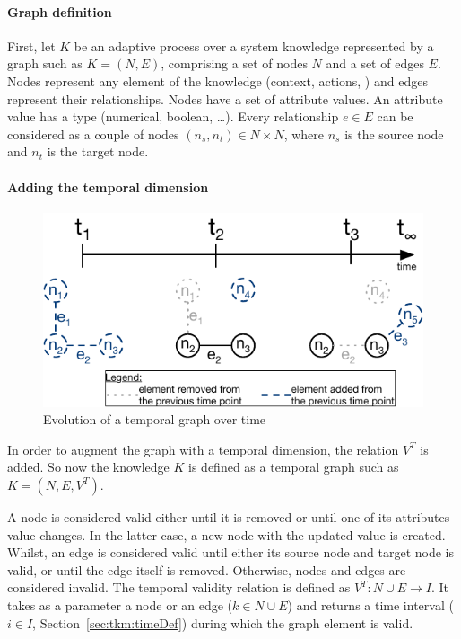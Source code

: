 \paragraph{Graph definition}
First, let $K$ be an adaptive process over a system \gls{knowledge} represented by a graph such as $K = (N, E)$, comprising a set of nodes $N$ and a set of edges $E$.
Nodes represent any element of the knowledge (context, actions, \etc) and edges represent their relationships.
Nodes have a set of attribute values.
An attribute value has a type (numerical, boolean, \ldots). 
Every relationship $e \in E$ can be considered as a couple of nodes $(n_s, n_t) \in N \times N$, where $n_s$ is the source node and $n_t$ is the target node.

\paragraph{Adding the temporal dimension}

\begin{figure}
   \centering
	\includegraphics{img/chapt-tkm/formalism/validityExample}
	\caption{Evolution of a temporal graph over time}
	\label{fig:tkm:validityEx}
\end{figure}

In order to augment the graph with a temporal dimension, the relation $V^T$ is added.
So now the knowledge $K$ is defined as a temporal graph such as $K = (N, E, V^T)$.

A node is considered valid either until it is removed or until one of its attributes value changes. 
In the latter case, a new node with the updated value is created.
Whilst, an edge is considered valid until either its source node and target node is valid, or until the edge itself is removed.
Otherwise, nodes and edges are considered invalid.
The temporal validity relation is defined as $V^T: N \cup E \rightarrow I$.
It takes as a parameter a node or an edge ($k \in N \cup E$) and returns a time interval ($i \in I$, \cf Section~\ref{sec:tkm:timeDef}) during which the graph element is valid.

